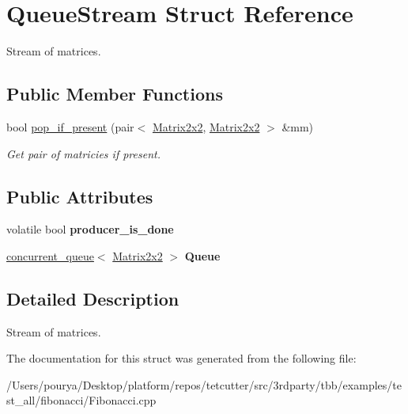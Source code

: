 \hypertarget{structQueueStream}{}\section{Queue\+Stream Struct Reference}
\label{structQueueStream}


Stream of matrices.  


\subsection*{Public Member Functions}
\begin{DoxyCompactItemize}
\item 
\hypertarget{structQueueStream_a8345f855ffebf50c6510b7136ef6f3ce}{}bool \hyperlink{structQueueStream_a8345f855ffebf50c6510b7136ef6f3ce}{pop\+\_\+if\+\_\+present} (pair$<$ \hyperlink{structMatrix2x2}{Matrix2x2}, \hyperlink{structMatrix2x2}{Matrix2x2} $>$ \&mm)\label{structQueueStream_a8345f855ffebf50c6510b7136ef6f3ce}

\begin{DoxyCompactList}\small\item\em Get pair of matricies if present. \end{DoxyCompactList}\end{DoxyCompactItemize}
\subsection*{Public Attributes}
\begin{DoxyCompactItemize}
\item 
\hypertarget{structQueueStream_aeae6c247bf270abee71fcdba530912a5}{}volatile bool {\bfseries producer\+\_\+is\+\_\+done}\label{structQueueStream_aeae6c247bf270abee71fcdba530912a5}

\item 
\hypertarget{structQueueStream_a3b4d9dec1d0498ef2f49af2c52b43112}{}\hyperlink{classtbb_1_1concurrent__queue}{concurrent\+\_\+queue}$<$ \hyperlink{structMatrix2x2}{Matrix2x2} $>$ {\bfseries Queue}\label{structQueueStream_a3b4d9dec1d0498ef2f49af2c52b43112}

\end{DoxyCompactItemize}


\subsection{Detailed Description}
Stream of matrices. 

The documentation for this struct was generated from the following file\+:\begin{DoxyCompactItemize}
\item 
/\+Users/pourya/\+Desktop/platform/repos/tetcutter/src/3rdparty/tbb/examples/test\+\_\+all/fibonacci/Fibonacci.\+cpp\end{DoxyCompactItemize}

